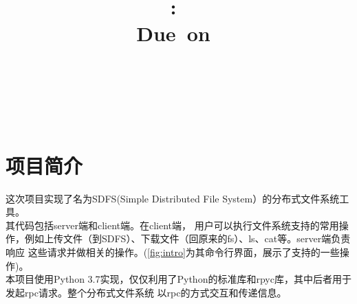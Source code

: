 \documentclass[a4paper]{article}
\title{
\vspace{2in}
\textmd{\textbf{\hmwkClass:\ \hmwkTitle}}\\
\normalsize\vspace{0.1in}\small{Due\ on\ \hmwkDueDate}\\
\vspace{0.1in}\large{\textit{\hmwkClassInstructor\ \hmwkClassTime}}
\vspace{3in}
}
\author{\textbf{\LARGE{\hmwkAuthorName}} \\ \\ \textbf{\LARGE{\hmwkAuthorId}}}
\date{} %
\begin{document}

\maketitle




\renewcommand{\contentsname}{Content} %
\newpage
\tableofcontents
{}
\newpage



\section{项目简介}
这次项目实现了名为SDFS(Simple Distributed File System）的分布式文件系统工具。\\

其代码包括server端和client端。在client端，
用户可以执行文件系统支持的常用操作，例如上传文件（到SDFS）、下载文件（回原来的fs）、ls、cat等。server端负责响应
这些请求并做相关的操作。(\autoref{fig:intro}为其命令行界面，展示了支持的一些操作)。\\

本项目使用Python 3.7实现，仅仅利用了Python的标准库和rpyc库，其中后者用于发起rpc请求。整个分布式文件系统
以rpc的方式交互和传递信息。\\
\end{document}
